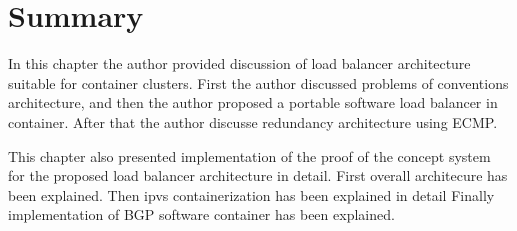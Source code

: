 \FloatBarrier



\section{Summary}
In this chapter the author provided discussion of load balancer architecture suitable for container clusters.
First the author discussed problems of conventions architecture, 
and then the author proposed a portable software load balancer in container.
After that the author discusse redundancy architecture using ECMP.

This chapter also presented implementation of the proof of the concept system for the proposed load balancer architecture in detail.
First overall architecure has been explained.
Then ipvs containerization has been explained in detail
Finally implementation of BGP software container has been explained.


